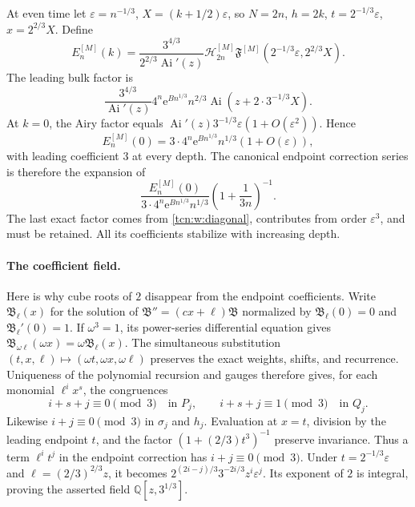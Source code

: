 \documentclass[11pt,letterpaper]{article}
\newcommand{\Ai}{\operatorname{Ai}}
\newcommand{\eps}{\varepsilon}
\newcommand{\ee}{\mathrm e}
\newcommand{\Q}{\mathbb Q}
\theoremstyle{remark}
\begin{document}
At even time let $\eps=n^{-1/3}$, $X=(k+1/2)\eps$, so $N=2n$, $h=2k$, $t=2^{-1/3}\eps$, $x=2^{2/3}X$. Define
\begin{equation}\label{tcn:w:E}
 E_n^{[M]}(k)=\frac{3^{4/3}}{2^{2/3}\Ai'(z)}
       \mathcal H_{2n}^{[M]}\mathfrak F^{[M]}(2^{-1/3}\eps,2^{2/3}X).
\end{equation}
The leading bulk factor is
\[
 \frac{3^{4/3}}{\Ai'(z)}4^n\ee^{Bn^{1/3}}n^{2/3}
            \Ai(z+2\cdot3^{-1/3}X).
\]
At $k=0$, the Airy factor equals $\Ai'(z)3^{-1/3}\eps(1+O(\eps^2))$. Hence
\begin{equation}\label{tcn:w:Eend}
 E_n^{[M]}(0)=3\cdot4^n\ee^{Bn^{1/3}}n^{1/3}(1+O(\eps)),
\end{equation}
with leading coefficient $3$ at every depth. The canonical endpoint correction series is therefore the expansion of
\begin{equation}\label{tcn:w:canonicalendpoint}
 \frac{E_n^{[M]}(0)}{3\cdot4^n\ee^{Bn^{1/3}}n^{1/3}}
                    \left(1+\frac1{3n}\right)^{-1}.
\end{equation}
The last exact factor comes from \eqref{tcn:w:diagonal}, contributes from order $\eps^3$, and must be retained. All its coefficients stabilize with increasing depth.

\paragraph{The coefficient field.}
Here is why cube roots of $2$ disappear from the endpoint coefficients. Write $\mathfrak B_\ell(x)$ for the solution of $\mathfrak B''=(cx+\ell)\mathfrak B$ normalized by $\mathfrak B_\ell(0)=0$ and $\mathfrak B_\ell'(0)=1$. If $\omega^3=1$, its power-series differential equation gives
$\mathfrak B_{\omega\ell}(\omega x)=\omega\mathfrak B_\ell(x)$.
The simultaneous substitution $(t,x,\ell)\mapsto(\omega t,\omega x,\omega\ell)$ preserves the exact weights, shifts, and recurrence. Uniqueness of the polynomial recursion and gauges therefore gives, for each monomial $\ell^ix^s$, the congruences
\[
 i+s+j\equiv0\pmod3\quad\text{in }P_j,\qquad
 i+s+j\equiv1\pmod3\quad\text{in }Q_j.
\]
Likewise $i+j\equiv0\pmod3$ in $\sigma_j$ and $h_j$. Evaluation at $x=t$, division by the leading endpoint $t$, and the factor $(1+(2/3)t^3)^{-1}$ preserve invariance. Thus a term $\ell^it^j$ in the endpoint correction has $i+j\equiv0\pmod3$. Under $t=2^{-1/3}\eps$ and $\ell=(2/3)^{2/3}z$, it becomes
$2^{(2i-j)/3}3^{-2i/3}z^i\eps^j$.
Its exponent of $2$ is integral, proving the asserted field $\Q[z,3^{1/3}]$.
\end{document}
